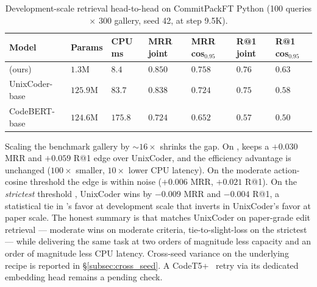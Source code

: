 \begin{table}[t]
\centering
\caption{Development-scale retrieval head-to-head on CommitPackFT
Python (100 queries $\times$ 300 gallery, seed 42, \CodeWM{} at
step 9.5K).}
\label{tab:foundation_bench}
\smallskip
\begin{tabular}{lllllll}
\toprule
Model & Params & CPU ms & MRR joint & MRR cos$_{0.95}$ & R@1 joint & R@1 cos$_{0.95}$ \\
\midrule
\CodeWM{} (ours) & $1.3$M & $8.4$ & $\mathbf{0.850}$ & $\mathbf{0.758}$ & $\mathbf{0.76}$ & $\mathbf{0.63}$ \\
UnixCoder-base & $125.9$M & $83.7$ & $0.838$ & $0.724$ & $0.75$ & $0.58$ \\
CodeBERT-base & $124.6$M & $175.8$ & $0.724$ & $0.652$ & $0.57$ & $0.50$ \\
\bottomrule
\end{tabular}
\end{table}

\begin{table}[t]
\centering
\caption{Paper-grade retrieval head-to-head on CommitPackFT Python
(1000 queries $\times$ 5000 gallery, seed 42, \CodeWM{} at the peak
step-28K checkpoint).   saturates to $\approx\!1.0$
for both models and is omitted.  CodeBERT was not rerun at this scale;
development-scale results above suggest the gap would widen against it.}
\label{tab:foundation_bench_paper}
\smallskip
{}
\end{table}

Scaling the benchmark gallery by $\sim\!16\times$ shrinks the gap.  On
, \CodeWM{} keeps a $+0.030$ MRR and $+0.059$ R@1 edge
over UnixCoder, and the efficiency advantage is unchanged ($100\times$
smaller, $10\times$ lower CPU latency).  On the moderate action-cosine
threshold  the edge is within noise ($+0.006$ MRR,
$+0.021$ R@1).  On the \emph{strictest} threshold ,
UnixCoder wins by $-0.009$ MRR and $-0.004$ R@1, a statistical tie in
\CodeWM{}'s favor at development scale that inverts in UnixCoder's
favor at paper scale.  The honest summary is that \CodeWM{} matches
UnixCoder on paper-grade edit retrieval --- moderate wins on moderate
criteria, tie-to-slight-loss on the strictest --- while delivering the
same task at two orders of magnitude less capacity and an order of
magnitude less CPU latency.  Cross-seed variance on the underlying recipe is reported in
\S\ref{subsec:cross_seed}.  A CodeT5+~\citep{wang2023codet5plus}
retry via its dedicated embedding head remains a pending check.

